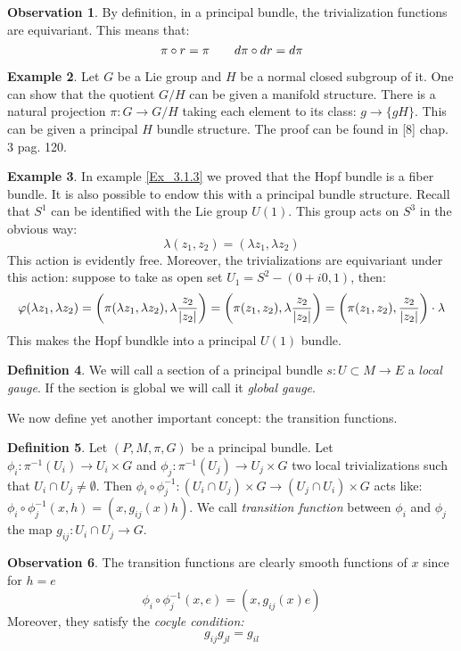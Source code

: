 \documentclass[12pt,a4paper]{report}
\theoremstyle{definition}
\newtheorem{Def}{Definition}[chapter]
\theoremstyle{Theorem}
\theoremstyle{definition}
\newtheorem{Ex}[Def]{Example}
\theoremstyle{definition}
\newtheorem{Obs}[Def]{Observation}
\begin{document}
	\begin{Obs} \label{Obs_3.5.1}
		By definition, in a principal bundle, the trivialization functions are equivariant. This means that:
		$$\pi\circ r=\pi\hspace{20 pt}d\pi\circ dr=d\pi$$
	\end{Obs}
	\begin{Ex}
		Let $G$ be a Lie group and $H$ be a normal closed subgroup of it. One can show that the quotient $G/H$ can be given a manifold structure.
		There is a natural projection $\pi:G\rightarrow G/H$ taking each element to its class: $g\rightarrow \{gH\}$. This can be given a principal $H$ bundle structure. The proof can be found in [8] chap. 3 pag. 120.
	\end{Ex}
	\begin{Ex}
		In example \ref{Ex_3.1.3} we proved that the Hopf bundle is a fiber bundle. It is also possible to endow this with a principal bundle structure. Recall that $S^1$ can be identified with the Lie group $U(1)$. This group acts on $S^3$ in the obvious way:
		$$\lambda(z_1,z_2)=(\lambda z_1,\lambda z_2)$$
		This action is evidently free. Moreover, the trivializations are equivariant under this action: suppose to take as open set $U_1=S^2-(0+i0,1)$, then:
		$$\varphi(\lambda z_1,\lambda z_2)=\bigg(\pi(\lambda z_1,\lambda
		z_2),\lambda{z_2\over |z_2|}\bigg)=\bigg(\pi(z_1,	z_2),\lambda{z_2\over |z_2|}\bigg)=\bigg(\pi(z_1,	z_2),{z_2\over |z_2|}\bigg)\cdot \lambda$$
		This makes the Hopf bundkle into a principal $U(1)$ bundle.
	\end{Ex}
	\begin{Def}
		We will call a section of a principal bundle $s:U\subset M\rightarrow E$ a \textit{local gauge}. If the section is global we will call it \textit{global gauge}.
	\end{Def}
	We now define yet another important concept: the transition functions.
	\begin{Def}
		Let $(P,M,\pi,G)$ be a principal bundle. Let $\phi_i:\pi^{-1}(U_i)\rightarrow U_i\times G$ and $\phi_j:\pi^{-1}(U_j)\rightarrow U_j\times G$ two local trivializations such that $U_i\cap U_j\neq\emptyset$. Then $\phi_i\circ\phi^{-1}_j:(U_i\cap U_j)\times G\rightarrow (U_j\cap U_i)\times G$ acts like: $\phi_i\circ\phi^{-1}_j(x,h)=(x,g_{ij}(x)h)$. We call \textit{transition function} between $\phi_i$ and $\phi_j$ the map $g_{ij}:U_i\cap U_j\rightarrow G$. 
	\end{Def}
	\begin{Obs}\label{Obs_3.5.2}
		The transition functions are clearly smooth functions of $x$ since for $h=e$
		$$\phi_i\circ\phi^{-1}_j(x,e)=(x,g_{ij}(x)e)$$
		Moreover, they satisfy the \textit{cocyle condition:}
		$$g_{ij}g_{jl}=g_{il}$$
	\end{Obs}
\end{document}
